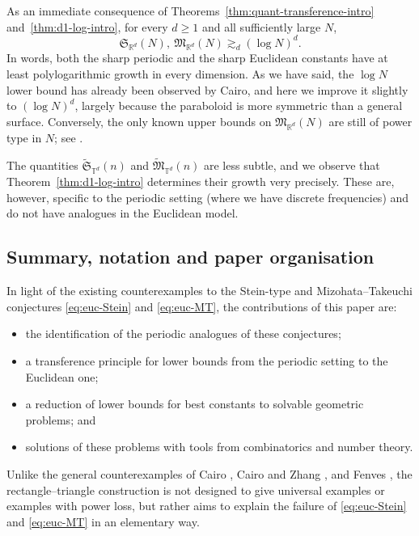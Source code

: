 \documentclass[11pt,reqno]{amsart}
\numberwithin{equation}{section}
\renewcommand{\ge}{\geqslant}
\begin{document}
As an immediate consequence of Theorems~\ref{thm:quant-transference-intro} and~\ref{thm:d1-log-intro}, for every $d\ge1$ and all sufficiently large $N$,
\begin{equation}\label{eq:justlog2}
\mathfrak{S}_{\mathbb{R}^d}(N),\ \mathfrak{M}_{\mathbb{R}^d}(N)\gtrsim_d (\log N)^d.
\end{equation}
In words, both the sharp periodic and the sharp Euclidean constants have at least polylogarithmic growth in every dimension. As we have said, the $\log N$ lower bound has already been observed by Cairo, and here we improve it slightly to $(\log N)^d$, largely because the paraboloid is more symmetric than a general surface.
Conversely, the only known upper bounds on $\mathfrak{M}_{\mathbb{R}^d}(N)$ are still of power type in $N$; see \cite{CIW}.

The quantities $\widetilde{\mathfrak{S}}_{\mathbb{T}^d}(n)$ and $\widetilde{\mathfrak{M}}_{\mathbb{T}^d}(n)$ are less subtle, and we observe that Theorem~\ref{thm:d1-log-intro} determines their growth very precisely. These are, however, specific to the periodic setting (where we have discrete frequencies) and do not have analogues in the Euclidean model.

\subsection{Summary, notation and paper organisation}
In light of the existing counterexamples to the Stein-type and Mizohata--Takeuchi conjectures \eqref{eq:euc-Stein} and \eqref{eq:euc-MT}, the contributions of this paper are:
\begin{itemize}
\item the identification of the periodic analogues of these conjectures;
\item a transference principle for lower bounds from the periodic setting to the Euclidean one;
\item a reduction of lower bounds for best constants to solvable geometric problems; and
\item solutions of these problems with tools from combinatorics and number theory.
\end{itemize}
Unlike the general counterexamples of Cairo \cite{Cairo}, Cairo and Zhang \cite{CairoZhang}, and Fenves \cite{Fenves}, the rectangle--triangle construction is not designed to give universal examples or examples with power loss, but rather aims to explain the failure of \eqref{eq:euc-Stein} and \eqref{eq:euc-MT} in an elementary way.
\end{document}
